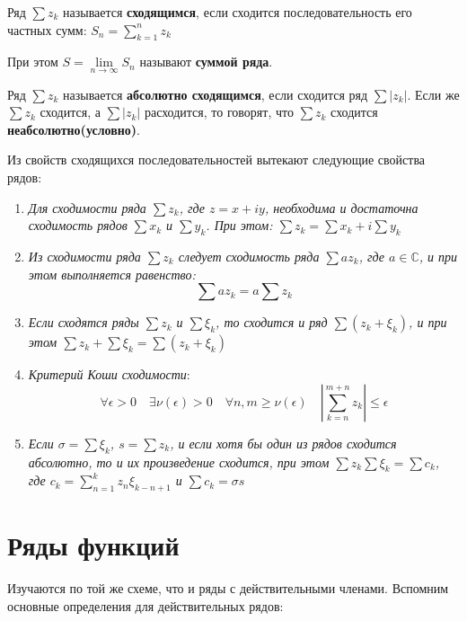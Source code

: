 \documentclass[a4paper, 12pt]{report}
\begin{document}
Ряд  $\sum z_k $ называется \textbf{сходящимся}, если сходится последовательность его частных сумм: $S_n= \sum\limits_{k=1}^n z_k$
\par\bigskip

При этом $S= \lim\limits_{n \to \infty} S_n$ называют \textbf{суммой ряда}.
\par\bigskip
Ряд $\sum z_k $ называется \textbf{абсолютно сходящимся}, если сходится ряд $\sum |z_k| $. Если же $\sum z_k $ сходится, а  $\sum |z_k| $ расходится, то говорят, что $\sum z_k $ сходится \textbf{неабсолютно(условно)}.
\par\bigskip
Из свойств сходящихся последовательностей вытекают следующие свойства рядов:
\begin{enumerate}
    \item \textit{Для сходимости ряда $\sum z_k $, где $z=x+iy$, необходима и достаточна сходимость рядов $\sum x_k $ и $\sum y_k $. При этом:
    $\sum z_k =\sum x_k+ i\sum y_k $}
    \item  \textit{Из сходимости ряда $\sum z_k $ следует сходимость ряда $\sum az_k $, где $a\in \mathbb{C}$, и при этом выполняется равенство:
    $$\sum az_k=a\sum z_k$$}
    \item \textit{Если сходятся ряды $\sum z_k$ и $\sum \xi_k$, то сходится и ряд $\sum (z_k+\xi_k)$, и при этом $\sum z_k + \sum \xi_k=\sum (z_k+\xi_k)$}
    \item \textit{Критерий Коши сходимости}:
    $$\forall \epsilon>0\quad \exists \nu(\epsilon)>0 \quad \forall n,m \geqslant \nu(\epsilon)\quad \left| \sum\limits_{k=n}^{m+n} z_k \right|\leqslant\epsilon$$
    \item \textit{Если $\sigma=\sum \xi_k$, $s=\sum z_k$, и если хотя бы один из рядов сходится абсолютно, то и их произведение сходится, при этом
$\sum z_k \sum \xi_k=\sum c_k$, где $c_k=\sum\limits_{n=1}^k z_n\xi_{k-n+1}$ и $\sum c_k=\sigma s$}
\end{enumerate}



\section{Ряды функций}  

Изучаются по той же схеме, что и ряды с действительными членами.
Вспомним основные определения для действительных рядов:
\end{document}
